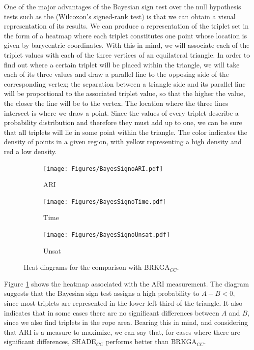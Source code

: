 \documentclass[review]{elsarticle}
\begin{document}
One of the major advantages of the Bayesian sign test over the null hypothesis tests such as the (Wilcoxon's signed-rank test) is that we can obtain a visual representation of its results. We can produce a representation of the triplet set in the form of a heatmap where each triplet constitutes one point whose location is given by barycentric coordinates. With this in mind, we will associate each of the triplet values with each of the three vertices of an equilateral triangle. In order to find out where a certain triplet will be placed within the triangle, we will take each of its three values and draw a parallel line to the opposing side of the corresponding vertex; the separation between a triangle side and its parallel line will be proportional to the associated triplet value, so that the higher the value, the closer the line will be to the vertex. The location where the three lines intersect is where we draw a point. Since the values of every triplet describe a probability distribution and therefore they must add up to one, we can be sure that all triplets will lie in some point within the triangle. The color indicates the density of points in a given region, with yellow representing a high density and red a low density.

\begin{figure}[ht!]
	\centering
	\begin{subfigure}{.45\textwidth}
		\texttt{[image: Figures/BayesSignoARI.pdf]}
		\caption{ARI}
		\label{fig:bayesARI}
	\end{subfigure}
	\begin{subfigure}{.45\textwidth}
		\texttt{[image: Figures/BayesSignoTime.pdf]}
		\caption{Time}
		\label{fig:bayesTime}
	\end{subfigure}
	\begin{subfigure}{.45\textwidth}
		\texttt{[image: Figures/BayesSignoUnsat.pdf]}
		\caption{Unsat}
		\label{fig:bayesUnsat}
	\end{subfigure}
	\caption{Heat diagrams for the comparison with BRKGA$_{CC}$.}
\end{figure}

Figure \ref{fig:bayesARI} shows the heatmap associated with the ARI measurement. The diagram suggests that the Bayesian sign test assigns a high probability to $A - B < 0$, since most triplets are represented in the lower left third of the triangle. It also indicates that in some cases there are no significant differences between $A$ and $B$, since we also find triplets in the rope area. Bearing this in mind, and considering that ARI is a measure to maximize, we can say that, for cases where there are significant differences, SHADE$_{CC}$ performs better than BRKGA$_{CC}$.
\end{document}
